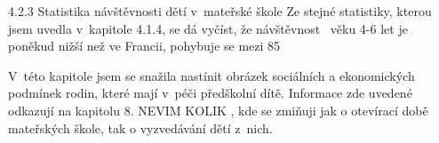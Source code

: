 4.2.3 Statistika návštěvnosti dětí v mateřské škole
Ze stejné statistiky, kterou jsem uvedla v kapitole 4.1.4, se dá vyčíst, že návštěvnost  věku 4-6 let je poněkud nižší než ve Francii, pohybuje se mezi 85%

V této kapitole jsem se snažila nastínit obrázek sociálních a ekonomických podmínek rodin, které mají v péči předškolní dítě. Informace zde uvedené odkazují na kapitolu 8. NEVIM KOLIK , kde se zmiňuji jak o otevírací době mateřských škole, tak o vyzvedávání dětí z nich. 
